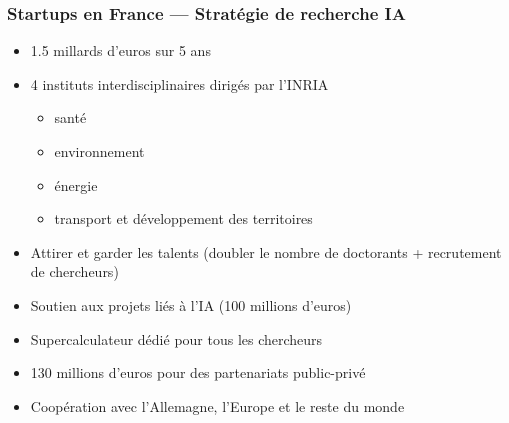 \begin{frame}
  \frametitle{Startups en France --- Stratégie de recherche IA}
  \begin{itemize}
    \item 1.5 millards d'euros sur 5 ans
    \item 4 instituts interdisciplinaires dirigés par l'INRIA
      \begin{itemize}
        \item santé
        \item environnement
        \item énergie
        \item transport et développement des territoires
        \end{itemize}
    \item Attirer et garder les talents (doubler le nombre de doctorants + recrutement de chercheurs)
    \item Soutien aux projets liés à l'IA (100 millions d'euros)
    \item Supercalculateur dédié pour tous les chercheurs
    \item 130 millions d'euros pour des partenariats public-privé
    \item Coopération avec l'Allemagne, l'Europe et le reste du monde
  \end{itemize}
\end{frame}
